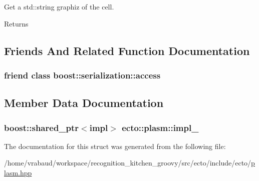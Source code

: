 \-Get a std\-::string graphiz of the cell. 

\begin{DoxyReturn}{\-Returns}

\end{DoxyReturn}


\subsection{\-Friends \-And \-Related \-Function \-Documentation}
\hypertarget{structecto_1_1plasm_ac98d07dd8f7b70e16ccb9a01abf56b9c}{
\subsubsection[{boost\-::serialization\-::access}]{\setlength{\rightskip}{0pt plus 5cm}friend class boost\-::serialization\-::access}}\label{structecto_1_1plasm_ac98d07dd8f7b70e16ccb9a01abf56b9c}


\subsection{\-Member \-Data \-Documentation}
\hypertarget{structecto_1_1plasm_a4cfd41e9dc82039a75970755565b2513}{
\subsubsection[{impl\-\_\-}]{\setlength{\rightskip}{0pt plus 5cm}boost\-::shared\-\_\-ptr$<$impl$>$ {\bf ecto\-::plasm\-::impl\-\_\-}}}\label{structecto_1_1plasm_a4cfd41e9dc82039a75970755565b2513}


\-The documentation for this struct was generated from the following file\-:\begin{DoxyCompactItemize}
\item 
/home/vrabaud/workspace/recognition\-\_\-kitchen\-\_\-groovy/src/ecto/include/ecto/\hyperlink{plasm_8hpp}{plasm.\-hpp}\end{DoxyCompactItemize}
